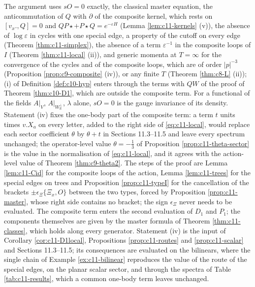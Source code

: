 \begin{remark}
\label{rem:c11-local}
The argument uses $sO=0$ exactly, the classical master equation, the anticommutation of $Q$ with $\partial$ of the composite kernel, which rests on $[v_x.,Q]=0$ and $QP\star+P\star Q=e^{-\varepsilon H}$ (Lemma \ref{lem:c11-kernels} (v)), the absence of $\log\varepsilon$ in cycles with one special edge, a property of the cutoff on every edge (Theorem \ref{thm:c11-simplex}), the absence of a term $\varepsilon^{-1}$ in the composite loops of $I$ (Theorem \ref{thm:c11-local} (ii)), and generic momenta at $T=\infty$ for the convergence of the cycles and of the composite loops, which are of order $|p|^{-3}$ (Proposition \ref{prop:c9-composite} (iv)), or any finite $T$ (Theorem \ref{thm:c8-L} (ii)); (i) of Definition \ref{def:c10-hyp} enters through the terms with $QW$ of the proof of Theorem \ref{thm:c10-D1}, which are outside the composite term. For a functional of the fields $A|_V$, $A|_{W_{\mathbb R}^\perp}$, $\lambda$ alone, $sO=0$ is the gauge invariance of its density. Statement (iv) fixes the one-body part of the composite term: a term $t$ units times $v.X_a$ on every letter, added to the right side of \eqref{eq:c11-local}, would replace each sector coefficient $\theta$ by $\theta+t$ in Sections 11.3--11.5 and leave every spectrum unchanged; the operator-level value $\theta=-\tfrac13$ of Proposition \ref{prop:c11-theta-sector} is the value in the normalisation of \eqref{eq:c11-local}, and it agrees with the action-level value of Theorem \ref{thm:c9-theta2}. The steps of the proof are Lemma \ref{lem:c11-Cid} for the composite loops of the action, Lemma \ref{lem:c11-trees} for the special edges on trees and Proposition \ref{prop:c11-typeI} for the cancellation of the brackets $\pm\epsilon_\Xi\{\Xi_x,O\}$ between the two types, forced by Proposition \ref{prop:c11-master}, whose right side contains no bracket; the sign $\epsilon_\Xi$ never needs to be evaluated. The composite term enters the second evaluation of $D_1$ and $P_1$; the components themselves are given by the master formula of Theorem \ref{thm:c11-classes}, which holds along every generator. Statement (iv) is the input of Corollary \ref{cor:c11-D1local}, Propositions \ref{prop:c11-routes} and \ref{prop:c11-scalar} and Sections 11.3--11.5; its consequences are evaluated on the bilinears, where the single chain of Example \ref{ex:c11-bilinear} reproduces the value of the route of the special edges, on the planar scalar sector, and through the spectra of Table \ref{tab:c11-results}, which a common one-body term leaves unchanged.
\end{remark}

